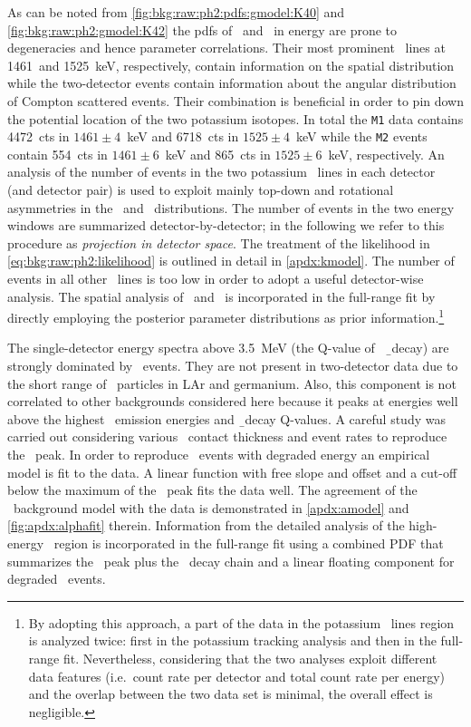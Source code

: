 As can be noted from \cref{fig:bkg:raw:ph2:pdfs:gmodel:K40} and
\cref{fig:bkg:raw:ph2:gmodel:K42} the pdfs of \kvn\ and \kvz\ in energy are prone to
degeneracies and hence parameter correlations. Their most prominent \g\ lines at 1461~and
1525~keV, respectively, contain information on the spatial distribution while the
two-detector events contain information about the angular distribution of Compton
scattered events. Their combination is beneficial in order to pin down the potential
location of the two potassium isotopes. In total the \texttt{M1} data contains 4472~cts in
$1461\pm4$~keV and 6718~cts in $1525\pm4$~keV while the \texttt{M2} events contain 554~cts
in $1461\pm6$~keV and 865~cts in $1525\pm6$~keV, respectively. An analysis of the number
of events in the two potassium \g\ lines in each detector (and detector pair) is used to
exploit mainly top-down and rotational asymmetries in the \kvn\ and \kvz\ distributions.
The number of events in the two energy windows are summarized detector-by-detector; in the
following we refer to this procedure as \textit{projection in detector space}. The
treatment of the likelihood in \cref{eq:bkg:raw:ph2:likelihood} is outlined in detail in
\cref{apdx:kmodel}.  The number of events in all other \g\ lines is too low in order to
adopt a useful detector-wise analysis. The spatial analysis of \kvn\ and \kvz\ is
incorporated in the full-range fit by directly employing the posterior parameter
distributions as prior information.\footnote{By adopting this approach, a part of the data
in the potassium \g\ lines region is analyzed twice: first in the potassium tracking
analysis and then in the full-range fit. Nevertheless, considering that the two analyses
exploit different data features (i.e.~count rate per detector and total count rate per
energy) and the overlap between the two data set is minimal, the overall effect is
negligible.}

The single-detector energy spectra above 3.5~MeV (the Q-value of \kvz\ \b\ decay) are
strongly dominated by \a\ events. They are not present in two-detector data due to the
short range of \a\ particles in LAr and germanium. Also, this component is not correlated
to other backgrounds considered here because it peaks at energies well above the highest
\g\ emission energies and \b\ decay Q-values. A careful study was carried out considering
various \pplus\ contact thickness and event rates to reproduce the \Po\ peak. In order to
reproduce \a\ events with degraded energy an empirical model is fit to the data. A linear
function with free slope and offset and a cut-off below the maximum of the \Po\ peak fits
the data well. The agreement of the \a\ background model with the data is demonstrated in
\cref{apdx:amodel} and \cref{fig:apdx:alphafit} therein. Information from the detailed
analysis of the high-energy \a\ region is incorporated in the full-range fit using a
combined PDF that summarizes the \Po\ peak plus the \Ra\ decay chain and a linear floating
component for degraded \a\ events.

